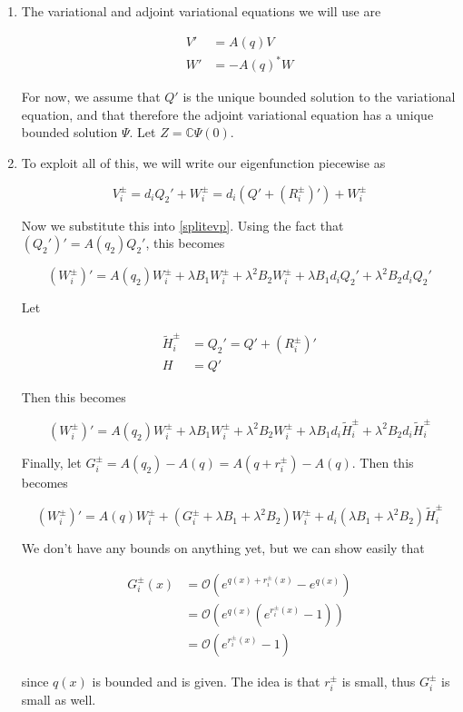 \documentclass[12pt]{article}
\def\C{{\mathbb C}}
\begin{document}
\begin{enumerate}
\item The variational and adjoint variational equations we will use are

\begin{align}
V' &= A(q)V \\
W' &= -A(q)^* W
\end{align}

For now, we assume that $Q'$ is the unique bounded solution to the variational equation, and that therefore the adjoint variational equation has a unique bounded solution $\Psi$. Let $Z = \C \Psi(0)$.

\item To exploit all of this, we will write our eigenfunction piecewise as

\[
V_i^\pm = d_i Q_2' + W_i^\pm = d_i(Q' + (R_i^\pm)') + W_i^\pm
\]


Now we substitute this into \eqref{splitevp}. Using the fact that $(Q_2')' = A(q_2)Q_2'$, this becomes

\[
(W_i^\pm)' =A(q_2)W_i^\pm + \lambda B_1 W_i^\pm + \lambda^2 B_2 W_i^\pm 
+ \lambda B_1 d_i Q_2' + \lambda^2 B_2 d_i Q_2' 
\]

Let 

\begin{align*}
\tilde{H}_i^\pm &= Q_2' = Q' + (R_i^\pm)' \\
H &= Q'
\end{align*}

Then this becomes

\[
(W_i^\pm)' =A(q_2)W_i^\pm + \lambda B_1 W_i^\pm + \lambda^2 B_2 W_i^\pm 
+ \lambda B_1 d_i \tilde{H}_i^\pm + \lambda^2 B_2 d_i \tilde{H}_i^\pm 
\]

Finally, let $G_i^\pm = A(q_2) - A(q) = A(q + r_i^\pm) - A(q)$. Then this becomes

\[
(W_i^\pm)' =A(q)W_i^\pm + (G_i^\pm + \lambda B_1 + \lambda^2 B_2) W_i^\pm 
+ d_i( \lambda B_1 + \lambda^2 B_2 ) \tilde{H}_i^\pm 
\]

We don't have any bounds on anything yet, but we can show easily that

\begin{align*}
G_i^\pm(x) &= \mathcal{O}(e^{q(x) + r_i^\pm(x)} - e^{q(x)} )\\
&= \mathcal{O}(e^{q(x)}(e^{r_i^\pm(x)} - 1)) \\
&= \mathcal{O}(e^{r_i^\pm(x)} - 1)
\end{align*}

since $q(x)$ is bounded and is given. The idea is that $r_i^\pm$ is small, thus $G_i^\pm$ is small as well.\\


\end{enumerate}
\end{document}
